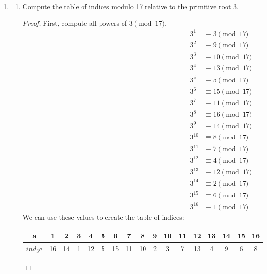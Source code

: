 \documentclass[11pt]{article}
\theoremstyle{definition}
\begin{document}
\begin{enumerate}
    \item \begin{enumerate}
        \item Compute the table of indices modulo 17 relative to the primitive root 3.
        \begin{proof}
            First, compute all powers of $3\pmod{17}$.
            \begin{align*}
                3^1 &\equiv 3\pmod{17} \\
                3^2 &\equiv 9\pmod{17} \\
                3^3 &\equiv 10\pmod{17} \\
                3^4 &\equiv 13\pmod{17} \\
                3^5 &\equiv 5\pmod{17} \\
                3^6 &\equiv 15\pmod{17} \\
                3^7 &\equiv 11\pmod{17} \\
                3^8 &\equiv 16\pmod{17} \\
                3^9 &\equiv 14\pmod{17} \\
                3^{10} &\equiv 8\pmod{17} \\
                3^{11} &\equiv 7\pmod{17} \\
                3^{12} &\equiv 4\pmod{17} \\
                3^{13} &\equiv 12\pmod{17} \\
                3^{14} &\equiv 2\pmod{17} \\
                3^{15} &\equiv 6\pmod{17} \\
                3^{16} &\equiv 1\pmod{17}
            \end{align*}
            We can use these values to create the table of indices:
            \begin{center}
            \begin{tabular}{ |c|c c c c c c c c c c c c c c c c| } 
                \hline
                a & 1 & 2 & 3 & 4 & 5 & 6 & 7 & 8 & 9 & 10 & 11 & 12 & 13 & 14 & 15 & 16 \\ 
                \hline
                $ind_3a$ & 16 & 14 & 1 & 12 & 5 & 15 & 11 & 10 & 2 & 3 & 7 & 13 & 4 & 9 & 6 & 8 \\ 
                \hline
            \end{tabular}
            \end{center}
        \end{proof}


\end{enumerate}
\end{enumerate}
\end{document}
